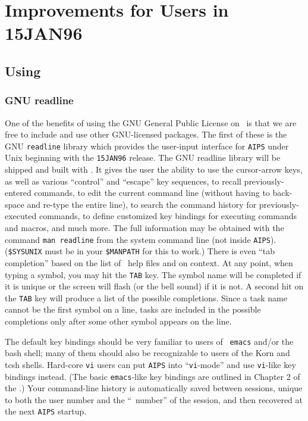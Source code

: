 \section{Improvements for Users in 15JAN96}

\subsection{Using \AIPS}

\subsubsection{GNU readline}

     One of the benefits of using the GNU General Public License on
\AIPS\ is that we are free to include and use other GNU-licensed
packages.  The first of these is the GNU {\tt readline} library which
provides the user-input interface for {\tt AIPS} under Unix beginning
with the {\tt 15JAN96} release. The GNU readline library will be
shipped and built with \hbox{\AIPS}.  It gives the user the ability to
use the cursor-arrow keys, as well as various ``control'' and
``escape'' key sequences, to recall previously-entered commands, to
edit the current command line (without having to back-space and
re-type the entire line), to search the command history for
previously-executed commands, to define customized key bindings for
executing commands and macros, and much more.  The full information
may be obtained with the command {\tt man readline} from the system
command line (not inside \hbox{{\tt AIPS}}).  ({\tt \$SYSUNIX} must be
in your {\tt \$MANPATH} for this to work.)  There is even ``tab
completion'' based on the list of \AIPS\ help files and on context.
At any point, when typing a symbol, you may hit the {\tt TAB} key.
The symbol name will be completed if it is unique or the screen will
flash (or the bell sound) if it is not.  A second hit on the {\tt TAB}
key will produce a list of the possible completions. Since a task name
cannot be the first symbol on a line, tasks are included in the
possible completions only after some other symbol appears on the line.

     The default key bindings should be very familiar to users of {\tt
emacs} and/or the bash shell; many of them should also be recognizable
to users of the Korn and tcsh shells.  Hard-core {\tt vi} users can
put {\tt AIPS} into ``{\tt vi}-mode'' and use {\tt vi}-like key
bindings instead.  (The basic {\tt emacs}-like key bindings are
outlined in Chapter 2 of the \Cookbook.)  Your command-line history is
automatically saved between sessions, unique to both the user number
and the ``\AIPS\ number'' of the session, and then recovered at the
next {\tt AIPS} startup.

